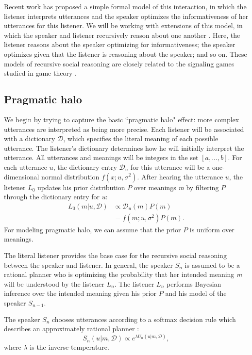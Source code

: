 \documentclass{article} %
\newcommand{\dictionary}{\ensuremath{\mathcal{D}}\xspace}
\begin{document}
Recent work \cite{frankgoodmanscience} has proposed a simple formal model of this interaction, in which the listener interprets utterances and the speaker optimizes the informativeness of her utterances for this listener. We will be working with extensions of this model, in which the speaker and listener recursively reason about one another \cite{jager2009pragmatic, bergen2012}. Here, the listener reasons about the speaker optimizing for informativeness; the speaker optimizes given that the listener is reasoning about the speaker; and so on. These models of recursive social reasoning are closely related to the signaling games studied in game theory \cite{cho1987signaling, chen2008selecting}.

\subsection{Pragmatic halo}

We begin by trying to capture the basic ``pragmatic halo" effect: more complex utterances are interpreted as being more precise. Each listener will be associated with a dictionary $\dictionary$, which specifies the literal meaning of each possible utterance. The listener's dictionary determines how he will initially interpret the utterance. All utterances and meanings will be integers in the set $[a,...,b]$. For each utterance $u$, the dictionary entry $\dictionary_u$ for this utterance will be a one-dimensional normal distribution $f(x;u,\sigma^2)$. After hearing the utterance $u$, the listener $L_0$ updates his prior distribution $P$ over meanings \emph{m} by filtering $P$ through the dictionary entry for $u$:
\begin{align}\label{eq:literallistener}
L_0(m | u, \dictionary) &\propto \dictionary_u(m)P(m) \\
&=f(m;u,\sigma^2)P(m).
\end{align}
For modeling pragmatic halo, we can assume that the prior $P$ is uniform over meanings.

The literal listener provides the base case for the recursive social reasoning between the speaker and listener. In general, the speaker $S_n$ is assumed to be a rational planner who is optimizing the probability that her intended meaning \emph{m} will be understood by the listener $L_n$. The listener $L_n$ performs Bayesian inference over the intended meaning given his prior $P$ and his model of the speaker $S_{n-1}$.

The speaker $S_n$ chooses utterances according to a softmax decision rule which describes an approximately rational planner \cite{sutton1998reinforcement}:
\begin{equation}\label{eq:speakerprob}
S_n(u | m,\dictionary) \propto e^{\lambda U_n(u | m,\dictionary)},
\end{equation}
where $\lambda$ is the inverse-temperature. 
\end{document}
